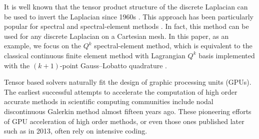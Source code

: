 \documentclass{article}
\begin{document}
It is well known that the tensor product structure of  the discrete Laplacian can be used to invert the Laplacian since 1960s \cite{lynch1964tensor}. This approach   has been particularly popular for spectral and spectral-element methods  \cite{HAIDVOGEL1979167, PATERA1986474, shen1994, kwan2007efficient,ChenShen2012}. 
In fact, this method can be used for any discrete Laplacian  on a Cartesian mesh.
In this paper, as an example, we focus on the $Q^k$ spectral-element method, which is equivalent to the classical continuous finite element method with Lagrangian $Q^k$ basis implemented with the  $(k+1)$-point Gauss--Lobatto quadrature \cite{maday1990optimal, li2022accuracy}. 
\begin{comment}
For solving a two-dimensional Poisson equation $-\Delta u=f$ on a square domain with suitable boundary conditions such as Dirichlet, Neumann and periodic boundaries, the stiffness matrix in the $Q^k$ spectral-element method on a uniform rectangular mesh  is given by
\[ S\otimes M+M\otimes S,\]
where $S$ and $M$ are the stiffness matrix and   mass matrix for a one-dimensional problem \cite{li2020superconvergence}.   
By considering a generalized eigenvalue problem $S\mathbf v=\lambda M\mathbf v$ where $\lambda$ is an eigenvalue and $\mathbf v$ is an eigenvector, the symmetry of both $S$ and $M$ ensures that $H=M^{-1} S$ is diagonalizable. Let $H=T\Lambda T^{-1}$ be its eigenvalue-decomposition  with $\Lambda$ being diagonal, then the stiffness matrix can be written as 
\[S\otimes M+M\otimes S=(M\otimes M)(H\otimes I+I\otimes H)=(M\otimes M)(T\otimes T)(\Lambda\otimes I+I\otimes \Lambda)(T^{-1}\otimes T^{-1}),\]
thus it can be inverted through
\[(S\otimes M+M\otimes S)^{-1}=(M^{-1}\otimes M^{-1})(T\otimes T)(\Lambda\otimes I+I\otimes \Lambda)^{-1}(T^{-1}\otimes T^{-1}),  \]
where $(\Lambda\otimes I+I\otimes \Lambda)^{-1}$ is a diagonal matrix. This simple Poisson solver can be easily extended to $d$ dimensions and it has acomputational complexity $\mathcal O(N^{1+\frac{1}{d}})$ on a $N=n^d$ grid.

 
\end{comment}
Tensor based  solvers naturally fit the design of graphic processing units (GPUs). The earliest successful attempts to accelerate the computation of high order accurate methods in scientific computing communities include nodal discontinuous Galerkin method \cite{klockner2009nodal} almost fifteen years ago. These pioneering efforts of GPU acceleration of high order methods, or even those ones published later such as \cite{chen2013gpu} in 2013, often rely on intensive coding.  
\end{document}
